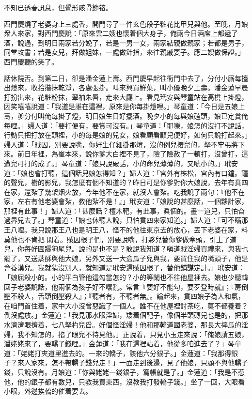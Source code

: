 \begin{myquote}
不知已透春訊息，但覺形骸骨節镕。
\end{myquote}

西門慶燒了老婆身上三處香，開門尋了一件玄色段子粧花比甲兒與他。至晚，月娘衆人來家，對西門慶說：「原來雲二嫂也懷着個大身子，俺兩今日酒席上都遞了酒，說過，到明日兩家若分娩了，若是一男一女，兩家結親做親家；若都是男子，同堂攻書；若是女兒，拜做姐妹，一處做針指，來往親戚耍子。應二嫂做保證。」西門慶聽的笑了。

話休饒舌。到第二日，卻是潘金蓮上壽。西門慶早起往衙門中去了，分付小厮每擡出燈來，收拾揩抹乾淨，各處張掛。叫來興買鮮菓，叫小優晚夕上壽。潘金蓮早晨打扮出來，花粧粉抹，翠袖朱唇，走來大廳上。看見玳安與琴童站在高櫈上掛燈，因笑嘻嘻說道：「我道是誰在這裡，原來是你每掛燈哩。」琴童道：「今日是五娘上壽，爹分付叫俺每掛了燈，明日娘生日好擺酒。晚夕小的每與娘磕頭，娘已定賞俺每哩。」婦人道：「要打便有，要賞可沒有。」琴童道：「耶嚛，娘怎的沒打不說話，行動只把打放在頭裡，小的每是娘的兒女，娘看顧看顧兒便好，如何只說打起來。」婦人道：「賊囚，別要說嘴，你好生仔細掛那燈，沒的例兒撦兒的，拏不牢弔將下來。前日年裡，為崔本來，說你爹大白裡不見了，險了險赦了一頓打，沒曾打，這遭兒可打的成了。」琴童道：「娘只說破話，小的命兒薄薄的，又唬小的。」{}玳安道：「娘也會打聽，這個話兒娘怎得知？」婦人道：「宮外有株松，宮內有口鐘。鐘的聲兒，樹的影兒，我怎麼有個不知道的？昨日可是你爹對你大娘說，去年有賁四在家，還紮了幾架烟火放，今年他不在家，就沒人會紮。吃我說了兩句：『他不在家，左右有他老婆會紮，教他紮不是！』」{}玳安道：「娘說的甚麼話，一個夥計家，那裡有此事！」婦人道：「甚麼話？檀木靶，有此事，眞個的。畫一道兒，只怕㒲過界兒去了。」琴童道：「娘也休聽人說，只怕賁四來家知道。」婦人道：「可不瞞那王八哩。我只說那王八也是明王八，怪不的他往東京去的放心，丟下老婆在家，料莫他也不肯把𣭈閑着。賊囚根子們，別要說嘴，打夥兒替你爹做牽頭，引上了道兒，你每好圖躧狗尾兒。說的是也不是？敢說我知道？嗔道賊淫婦買禮來，與我也罷了，又送蒸酥與他大娘，另外又送一大盒瓜子兒與我，要買住我的嘴頭子，他是會養漢兒。我就猜沒別人，就知道是玳安這賊囚根子，替他鋪謀定計。」玳安道：「娘屈殺小的。小的平白管他這勾當怎的？小的等閑也不往他屋裡去。娘也少聽韓回子老婆說話，他兩個為孩子好不嚷亂。常言『要好不能勾，要歹登時就』；『房倒壓不殺人，舌頭倒壓殺人』；『聽者有，不聽者無』。論起來，賁四娘子為人和氣，在咱門首住着，家中大小沒曾惡識了一個人。誰不在他屋裡討茶吃，莫不都養着？倒沒處放。」金蓮道：「我見那水眼淫婦，矮着個靶子，像個半頭磚兒也是的，把那水濟濟眼擠着，七八拏杓兒舀。好個怪淫婦！他和那韓道國老婆，那長大摔瓜的淫婦，我不知怎的，掐了眼兒不待見他。」{}正說着，只見小玉走來說：「俺娘請五娘，潘姥姥來了，要轎子錢哩。」金蓮道：「我在這裡站着，他從多咱進去了？」琴童道：「姥姥打夾道里進去的。一來的轎子，該他六分銀子。」金蓮道：「我那得銀子？來人家來，怎不帶轎子錢兒走！」一面走到後邊，見了他娘，只顧不與他轎子錢，只說沒有。{}月娘道：「你與姥姥一錢銀子，寫帳就是了。」金蓮道：「我是不惹他，他的銀子都有數兒，只教我買東西，沒教我打發轎子錢。」坐了一回，大眼看小眼，外邊挨轎的催着要去。

